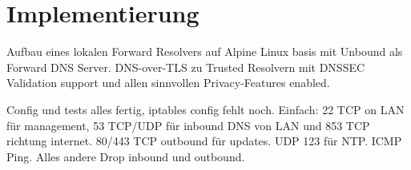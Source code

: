 \chapter{Implementierung}
\label{chap:implementation}


\begin{draft}
Aufbau eines lokalen Forward Resolvers auf Alpine Linux basis mit Unbound als Forward DNS Server.
DNS-over-TLS zu Trusted Resolvern mit DNSSEC Validation support und allen sinnvollen Privacy-Features enabled. 

Config und tests alles fertig, iptables config fehlt noch. Einfach: 22 TCP on LAN für management, 53 TCP/UDP für inbound DNS von LAN und 853 TCP richtung internet. 80/443 TCP outbound für updates. UDP 123 für NTP. ICMP Ping. Alles andere Drop inbound und outbound.
\end{draft}
